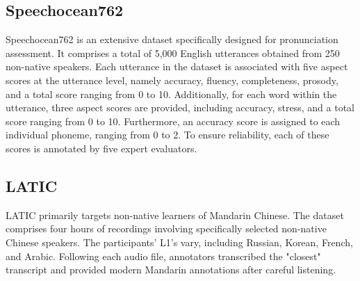 


\subsection{Speechocean762 \cite{speechocean762}}
Speechocean762 is an extensive dataset specifically designed for pronunciation assessment. It comprises a total of 5,000 English utterances obtained from 250 non-native speakers. Each utterance in the dataset is associated with five aspect scores at the utterance level, namely accuracy, fluency, completeness, prosody, and a total score ranging from 0 to 10. Additionally, for each word within the utterance, three aspect scores are provided, including accuracy, stress, and a total score ranging from 0 to 10. Furthermore, an accuracy score is assigned to each individual phoneme, ranging from 0 to 2. To ensure reliability, each of these scores is annotated by five expert evaluators.



 
\subsection{LATIC \cite{mqtj-qh10-21}}
LATIC primarily targets non-native learners of Mandarin Chinese. The dataset comprises four hours of recordings involving specifically selected non-native Chinese speakers. The participants' L1's vary, including Russian, Korean, French, and Arabic. Following each audio file, annotators transcribed the "closest" transcript and provided modern Mandarin annotations after careful listening.

